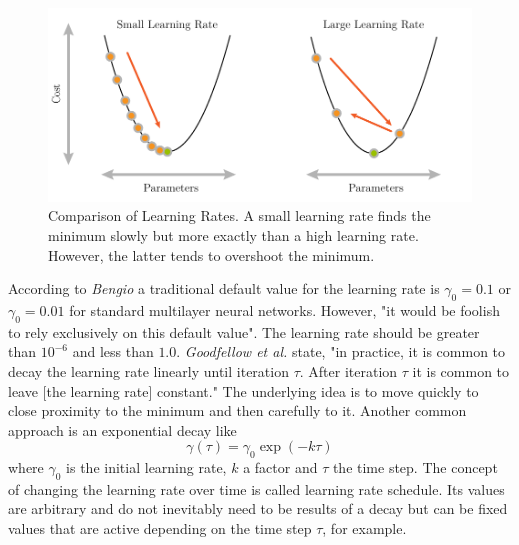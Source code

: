\begin{figure}
	\centering
	\includegraphics[]{images/gradient_descent_learning_rate.pdf}
	\caption[Comparison of Learning Rates]{Comparison of Learning Rates. A small learning rate finds the minimum slowly but more exactly than a high learning rate. However, the latter tends to overshoot the minimum.}
	\label{fig:learning-rate}
\end{figure}
According to \textit{Bengio} \cite{DBLP:journals/corr/abs-1206-5533} a traditional default value for the learning rate is $\gamma_0 = 0.1$ or $\gamma_0 = 0.01$ for standard multilayer neural networks.
However, "it would be foolish to rely exclusively on this default value".
The learning rate should be greater than $10^{-6}$ and less than $1.0$.
\textit{Goodfellow et al.} \cite{Goodfellow-et-al-2016} state, "in practice, it is common to decay the learning rate linearly until iteration $\tau$. After iteration $\tau$ it is common to leave [the learning rate] constant."
The underlying idea is to move quickly to close proximity to the minimum and then carefully to it.
Another common approach is an exponential decay like
\begin{equation}
	\gamma(\tau) = \gamma_0 \exp(-k\tau)
\end{equation}
where $\gamma_0$ is the initial learning rate, $k$ a factor and $\tau$ the time step.
The concept of changing the learning rate over time is called learning rate schedule. Its values are arbitrary and do not inevitably need to be results of a decay but can be fixed values that are active depending on the time step $\tau$, for example.

